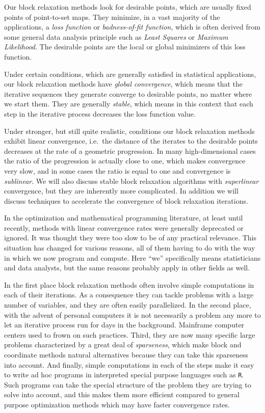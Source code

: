 \documentclass[
  12pt,
]{book}
\begin{document}
Our block relaxation methods look for desirable points, which are usually fixed points of point-to-set maps. They minimize, in a vast majority of the applications, a \emph{loss function} or \emph{badness-of-fit function}, which is often derived from some general data analysis principle such as \emph{Least Squares} or \emph{Maximum Likelihood}. The desirable points are the local or global minimizers of this loss function.

Under certain conditions, which are generally satisfied in statistical applications, our block relaxation methods have \emph{global convergence}, which means that the iterative sequences they generate converge
to desirable points, no matter where we start them. They are generally \emph{stable}, which means in this context that each step in the iterative process decreases the loss function value.

Under stronger, but still quite realistic, conditions our block relaxation methods exhibit linear convergence, i.e.~the distance of the iterates to the desirable points decreases at the rate of a geometric progression. In many high-dimensional cases the ratio of the progression is actually close to one, which makes convergence very slow, and in some cases the ratio is equal to one and convergence is \emph{sublinear}. We will also discuss stable block relaxation algorithms with \emph{superlinear} convergence, but they are inherently more complicated. In addition we will discuss techniques to accelerate the convergence of block relaxation iterations.

In the optimization and mathematical programming literature, at least until recently, methods with linear convergence rates were generally deprecated or ignored. It was thought they were too slow to be of any practical relevance. This situation has changed for various reasons, all of them having to do with the way in which we now program and compute. Here ``we'' specifically means statisticians and data analysts, but the same reasons probably apply in other fields as well.

In the first place block relaxation methods often involve simple computations in each of their iterations. As a consequence they can tackle problems with a large number of variables, and they are often easily parallelized. In the second place, with the advent of personal computers it is not necessarily a problem any more to let an iterative process run for days in the background. Mainframe computer centers used to frown on such practices. Third, they are now many specific large problems characterized by a great deal of \emph{sparseness}, which make block and coordinate methods natural alternatives because they can take this sparseness into account. And finally, simple computations in each of the steps make it easy to write ad hoc programs in interpreted special purpose languages such as \texttt{R}. Such programs can take the special structure of the problem they are trying to solve into account, and this makes them more efficient compared to general purpose optimization methods which may have faster convergence rates.
\end{document}
